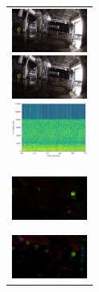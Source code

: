 \begin{enumerate}
\begin{end}
\begin{figure}[htbp]
\begin{tabular}{l}
\begin{minipage}{0.165\hsize}
\begin{center}
        \end{center}
      \end{minipage}
      \begin{minipage}{0.165\hsize}
        \begin{center}
          \includegraphics[clip, width=2.5cm]{./Figures/still_stop2-4.eps}
        \end{center}
      \end{minipage}
      \begin{minipage}{0.165\hsize}
        \begin{center}
          \includegraphics[clip, width=2.5cm]{./Figures/still_stop2-5.eps}
        \end{center}
      \end{minipage}
      \begin{minipage}{0.165\hsize}
        \begin{center}
          \includegraphics[clip, width=2.5cm]{./Figures/sound_stop2.eps}
        \end{center}
      \end{minipage}
\\  %
      \begin{minipage}{0.165\hsize}
        \begin{center}
          \includegraphics[clip, width=2.5cm]{./Figures/optic_stop2-1.eps}
          \hspace{0.3cm} { }
        \end{center}
      \end{minipage}
      \begin{minipage}{0.165\hsize}
        \begin{center}
          \includegraphics[clip, width=2.5cm]{./Figures/optic_stop2-2.eps}

\end{center}
\end{minipage}
\end{tabular}
\end{figure}
\end{end}
\end{enumerate}
